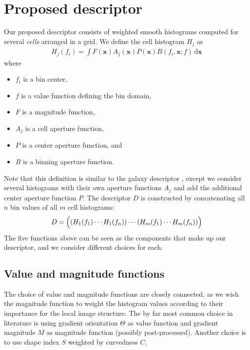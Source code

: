 \documentclass[thesis.tex]{subfiles}
\def\x{\mathbf{x}}
\begin{document}
\chapter{Proposed descriptor}
%
Our proposed descriptor consists of weighted smooth histograms computed for several \textit{cells} arranged in a grid. We define the cell histogram $H_j$ as
%
\begin{align}
\label{eq:proposed_histogram}
H_j(f_i) = \int F(\x) A_j (\x) P (\x) B(f_i, \x; f) \,\text{d} \x
\end{align}
%
where
%
\begin{itemize}
\item[] $f_i$ is a bin center,
\item[] $f$ is a value function defining the bin domain,
\item[] $F$ is a magnitude function,
\item[] $A_j$ is a cell aperture function,
\item[] $P$ is a center aperture function, and
\item[] $B$ is a binning aperture function.
\end{itemize}
%
Note that this definition is similar to the galaxy descriptor \cite{pedersen2013shape}, except we consider several histograms with their own aperture functions $A_j$ and add the additional center aperture function $P$. The descriptor $D$ is constructed by concatenating all $n$ bin values of all $m$ cell histograms:
%
\begin{align}
\label{eq:proposed_descriptor}
D = \Bigl( \left(H_1(f_1) \cdots H_1(f_n)\right) \cdots (H_m(f_1) \cdots H_m(f_n)) \Bigr)
\end{align}
%
The five functions above can be seen as the components that make up our descriptor, and we consider different choices for each.
%
\section{Value and magnitude functions}
\label{sec:valueMagnitudeFunctions}
%
The choice of value and magnitude functions are closely connected, as we wish the magnitude function to weight the histogram values according to their importance for the local image structure. The by far most common choice in literature \cite{lowe2004distinctive,ke2004pca,mikolajczyk2005performance,tola2008fast} is using gradient orientation $\Theta$ as value function and gradient magnitude $M$ as magnitude function (possibly post-processed). Another choice \cite{pedersen2013shape} is to use shape index $S$ weighted by curvedness $C$.
\end{document}
